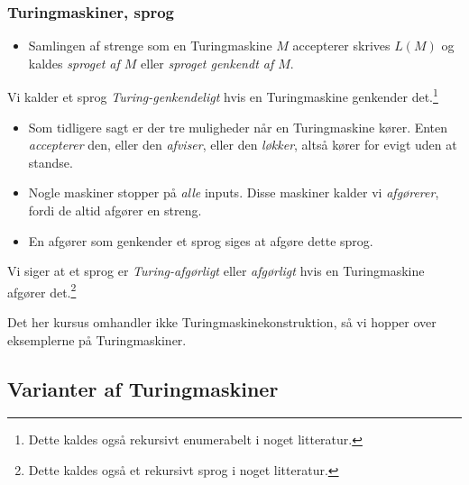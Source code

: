 \begin{frame}[allowframebreaks]
  \frametitle{Turingmaskiner, sprog}

  \begin{itemize}
    \item Samlingen af strenge som en Turingmaskine $M$ accepterer skrives $L(M)$ og kaldes \textit{sproget af $M$} eller \textit{sproget genkendt af $M$}.
  \end{itemize}

  \begin{definition}
Vi kalder et sprog \textit{Turing-genkendeligt} hvis en Turingmaskine genkender det.\footnote{Dette kaldes også rekursivt enumerabelt i noget litteratur.}
  \end{definition}

  \begin{itemize}
    \item Som tidligere sagt er der tre muligheder når en Turingmaskine kører. Enten \textit{accepterer} den, eller den \textit{afviser}, eller den \textit{løkker}, altså kører for evigt uden at standse.
    \item Nogle maskiner stopper på \textit{alle} inputs. Disse maskiner kalder vi \textit{afgørerer}, fordi de altid afgører en streng.
    \item En afgører som genkender et sprog siges at afgøre dette sprog.
  \end{itemize}

  \begin{definition}
Vi siger at et sprog er \textit{Turing-afgørligt} eller \textit{afgørligt} hvis en Turingmaskine afgører det.\footnote{Dette kaldes også et rekursivt sprog i noget litteratur.}
  \end{definition}

  \begin{itemize}
Det her kursus omhandler ikke Turingmaskinekonstruktion, så vi hopper over eksemplerne på Turingmaskiner.
  \end{itemize}
\end{frame}

\subsection{Varianter af Turingmaskiner}%
\label{subsec:label}

